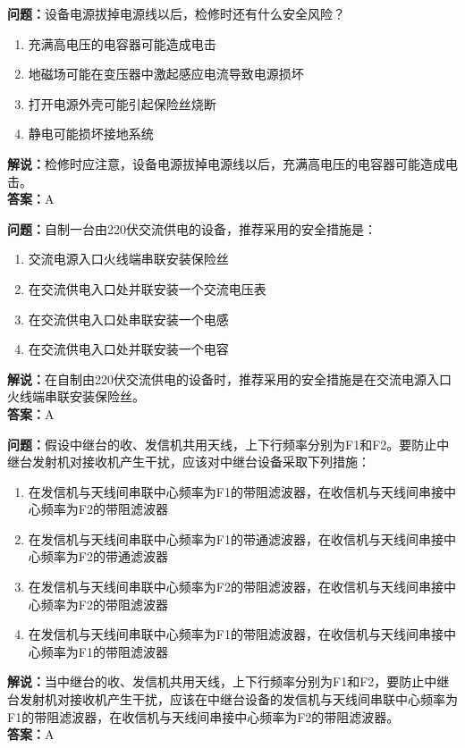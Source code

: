 \documentclass[UTF8]{ctexbook}
\begin{document}
\textbf{问题：}设备电源拔掉电源线以后，检修时还有什么安全风险？
\begin{enumerate}[label=\Alph*), leftmargin=3em]
  \item 充满高电压的电容器可能造成电击
  \item 地磁场可能在变压器中激起感应电流导致电源损坏
  \item 打开电源外壳可能引起保险丝烧断
  \item 静电可能损坏接地系统
\end{enumerate}
\textbf{解说：}检修时应注意，设备电源拔掉电源线以后，充满高电压的电容器可能造成电击。\\
\textbf{答案：}A

\textbf{问题：}自制一台由220伏交流供电的设备，推荐采用的安全措施是：
\begin{enumerate}[label=\Alph*), leftmargin=3em]
  \item 交流电源入口火线端串联安装保险丝
  \item 在交流供电入口处并联安装一个交流电压表
  \item 在交流供电入口处串联安装一个电感
  \item 在交流供电入口处并联安装一个电容
\end{enumerate}
\textbf{解说：}在自制由220伏交流供电的设备时，推荐采用的安全措施是在交流电源入口火线端串联安装保险丝。\\
\textbf{答案：}A

\textbf{问题：}假设中继台的收、发信机共用天线，上下行频率分别为F1和F2。要防止中继台发射机对接收机产生干扰，应该对中继台设备采取下列措施：
\begin{enumerate}[label=\Alph*), leftmargin=3em]
  \item 在发信机与天线间串联中心频率为F1的带阻滤波器，在收信机与天线间串接中心频率为F2的带阻滤波器
  \item 在发信机与天线间串联中心频率为F1的带通滤波器，在收信机与天线间串接中心频率为F2的带通滤波器
  \item 在发信机与天线间串联中心频率为F2的带阻滤波器，在收信机与天线间串接中心频率为F2的带阻滤波器
  \item 在发信机与天线间串联中心频率为F1的带阻滤波器，在收信机与天线间串接中心频率为F1的带阻滤波器
\end{enumerate}
\textbf{解说：}当中继台的收、发信机共用天线，上下行频率分别为F1和F2，要防止中继台发射机对接收机产生干扰，应该在中继台设备的发信机与天线间串联中心频率为F1的带阻滤波器，在收信机与天线间串接中心频率为F2的带阻滤波器。\\
\textbf{答案：}A
\end{document}
